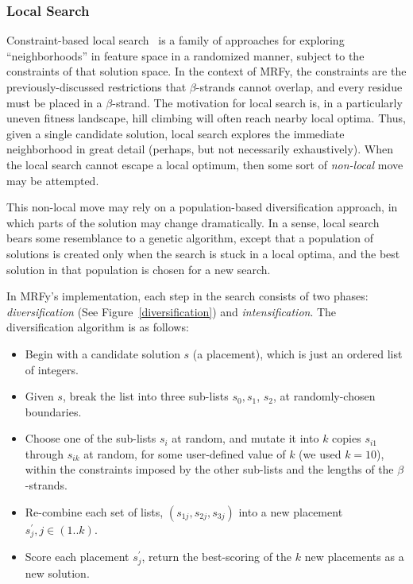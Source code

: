 \documentclass{acm_proc_article-sp}
\begin{document}
\subsubsection{Local Search}\label{localsearch}

Constraint-based local search~\cite{Hentenryck:2009vn} is a family of approaches
for exploring ``neighborhoods'' in feature space in a randomized manner, 
subject to the constraints of that solution space.
In the context of MRFy, the constraints are the previously-discussed 
restrictions that $\beta$-strands cannot overlap, and every residue must be
placed in a $\beta$-strand.
The motivation for local search is, in a particularly uneven
fitness landscape, hill climbing will often reach nearby local optima. Thus,
given a single candidate solution, local search explores the immediate 
neighborhood in great detail (perhaps, but not necessarily exhaustively).
When the local search cannot escape a local optimum, then some sort of 
\emph{non-local} move may be attempted.

This non-local move may rely on a population-based diversification approach,
in which parts of the solution may change dramatically.
In a sense, local search bears some resemblance to a genetic algorithm,
except that a population of solutions is created only when the search is stuck
in a local optima, and the best solution in that population is chosen for a new
search.

In MRFy's implementation, each step in the search consists of two phases: 
\emph{diversification} (See Figure~\ref{diversification}) and 
\emph{intensification}.
The diversification algorithm is as follows:
\begin{itemize}
\item Begin with a candidate solution $s$ (a placement), which is just
an ordered list of integers.
\item Given $s$, break the list into three sub-lists $s_{0}, s_{1}$, $s_{2}$, 
at randomly-chosen boundaries.
\item Choose one of the sub-lists $s_{i}$ at random, and mutate it into $k$ 
copies $s_{i1}$ through $s_{ik}$ at random, for some user-defined value of $k$ 
(we used $k=10$), within
the constraints imposed by the other sub-lists and the lengths of the 
$\beta$-strands.
\item Re-combine each set of lists, $(s_{1j}, s_{2j}, s_{3j})$ into a new 
placement $s^{\prime}_{j}, j \in (1..k)$.
\item Score each placement $s^{\prime}_{j}$, return the best-scoring of the $k$ new placements as a new solution.
\end{itemize}
\end{document}

